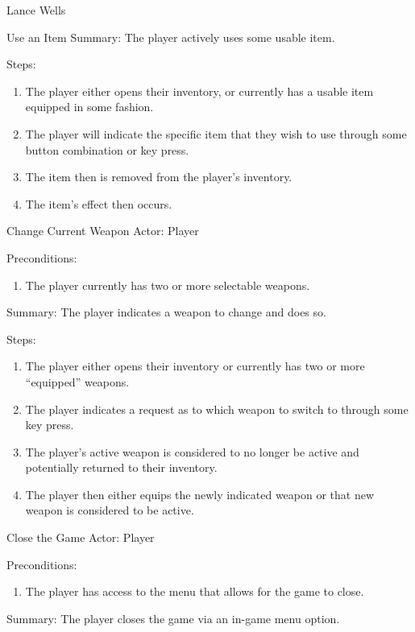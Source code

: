 \documentclass[12pt]{report}
\begin{document}
\begin{section}{Lance Wells}
\begin{subsection}{Use an Item}
Summary: The player actively uses some usable item.

Steps:
\begin{enumerate}
\item The player either opens their inventory, or currently has a usable
item equipped in some fashion.
\item The player will indicate the specific item that they wish to use
through some button combination or key press.
\item The item then is removed from the player's inventory.
\item The item's effect then occurs.
\end{enumerate}
\end{subsection}

\begin{subsection}{Change Current Weapon}
Actor: Player

Preconditions:
\begin{enumerate}
\item The player currently has two or more selectable weapons.
\end{enumerate}

Summary: The player indicates a weapon to change and does so.

Steps:
\begin{enumerate}
\item The player either opens their inventory or currently has two or more
``equipped'' weapons.
\item The player indicates a request as to which weapon to switch to through
some key press.
\item The player's active weapon is considered to no longer be active and
potentially returned to their inventory.
\item The player then either equips the newly indicated weapon or that new
weapon is considered to be active.
\end{enumerate}
\end{subsection}

\begin{subsection}{Close the Game}
Actor: Player

Preconditions:
\begin{enumerate}
\item The player has access to the menu that allows for the game to close.
\end{enumerate}

Summary: The player closes the game via an in-game menu option.


\end{subsection}
\end{section}
\end{document}
